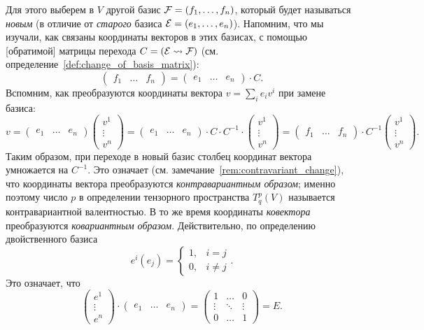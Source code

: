 Для этого выберем в $V$ другой базис $\mathcal F = (f_1,\dots,f_n)$,
который будет называться {\em новым} (в отличие от {\em старого}
базиса $\mathcal E = (e_1,\dots,e_n)$). Напомним, что мы изучали, как
связаны координаты векторов в этих базисах, с помощью [обратимой]
матрицы перехода
$C = (\mathcal E\rightsquigarrow\mathcal F)$
(см. определение~\ref{def:change_of_basis_matrix}):
$$
\begin{pmatrix} f_1 & \dots & f_n\end{pmatrix} =
\begin{pmatrix} e_1 & \dots & e_n\end{pmatrix}\cdot C.
$$
Вспомним, как преобразуются координаты вектора $v = \sum_i e_iv^i$ при
замене базиса:
$$
v = \begin{pmatrix}e_1 & \dots & e_n\end{pmatrix}
\begin{pmatrix}v^1\\\vdots\\ v^n\end{pmatrix} =
\begin{pmatrix}e_1 & \dots & e_n\end{pmatrix}\cdot C\cdot C^{-1}\cdot
\begin{pmatrix}v^1\\\vdots\\ v^n\end{pmatrix} =
\begin{pmatrix}f_1 & \dots & f_n\end{pmatrix}\cdot
C^{-1}\begin{pmatrix}v^1\\\vdots\\ v^n\end{pmatrix}.
$$
Таким образом, при переходе в новый базис столбец координат вектора
умножается на $C^{-1}$. Это означает
(см. замечание~\ref{rem:contravariant_change}), что координаты вектора
преобразуются {\em контравариантным образом}; именно поэтому число $p$
в определении тензорного пространства $T^p_q(V)$ называется
контравариантной валентностью.
В то же время координаты {\em ковектора} преобразуются
{\em ковариантным образом}. Действительно, по определению
двойственного базиса
$$
e^i(e_j)= \begin{cases}1,&i=j\\ 0,&i\neq j\end{cases}.
$$
Это означает, что
$$
\begin{pmatrix}e^1\\ \vdots \\ e^n\end{pmatrix}
\cdot
\begin{pmatrix}e_1 & \dots & e_n\end{pmatrix} =
\begin{pmatrix} 1 & \dots & 0\\\vdots & \ddots & \vdots\\0 & \dots &
  1\end{pmatrix} = E.
$$
